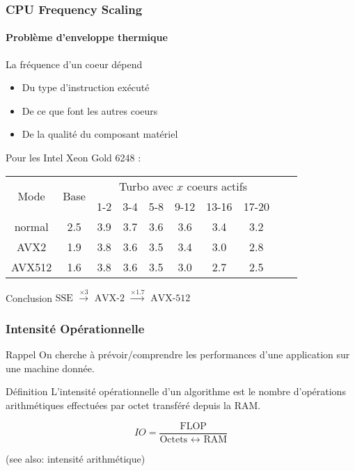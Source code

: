 \documentclass[xcolor={x11names,svgnames}]{beamer}
\begin{document}

\begin{frame}
  \frametitle{CPU Frequency Scaling}
  \framesubtitle{Problème d'enveloppe thermique}
  
  \begin{block}{La fréquence d'un coeur dépend}
  \begin{itemize}
  \item Du type d'instruction exécuté
  \item De ce que font les autres coeurs
  \item De la qualité du composant matériel
  \end{itemize}
\end{block}

\bigskip

Pour les Intel Xeon Gold 6248 :

\medskip

\centering
  \small
\begin{tabular}{|c|c||c|c|c|c|c|c|c|c|}
  \hline
  \multirow{2}{*}{Mode}   & \multirow{2}{*}{Base} & \multicolumn{6}{c|}{Turbo avec $x$ coeurs actifs} \\
  & &             1-2 & 3-4 & 5-8 & 9-12 & 13-16 & 17-20 \\
  \hline\hline
  normal & 2.5	& 3.9 & 3.7 & 3.6 & 3.6 & 3.4 & 3.2 \\
  \hline
  AVX2	 & 1.9	& 3.8 & 3.6 & 3.5 & 3.4 & 3.0 & 2.8 \\
  \hline
  AVX512 & 1.6	& 3.8 & 3.6 & 3.5 & 3.0 & 2.7 & 2.5 \\
  \hline
\end{tabular}

\begin{alertblock}{Conclusion}
  \centering
  $\text{SSE } \xrightarrow{\times 3} \text{ AVX-2 } \xrightarrow{\times 1.7} \text{ AVX-512}$
\end{alertblock}

\end{frame}


\begin{frame}
  \frametitle{Intensité Opérationnelle}

  \begin{block}{Rappel}
    On cherche à prévoir/comprendre les performances d'une application sur une machine donnée.
  \end{block}

  \begin{exampleblock}{Définition}
    L'\alert{intensité opérationnelle} d'un algorithme est le nombre
    d'opérations arithmétiques effectuées par octet transféré depuis la RAM.
  \end{exampleblock}
  
  \[
    IO = \dfrac{\text{FLOP}}{\text{Octets }\leftrightarrow\text{ RAM}}
  \]

  (see also: intensité arithmétique)
\end{frame}
\end{document}
